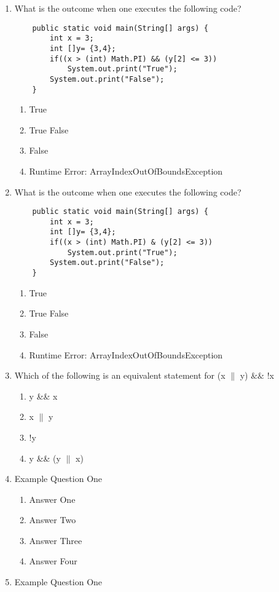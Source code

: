 \documentclass[11pt,fleqn]{article}
\begin{document}
\begin{enumerate}
\begin{enumerate}
	\end{enumerate}
\item What is the outcome when one executes the following code?
	\begin{verbatim}
	public static void main(String[] args) {
		int x = 3;
		int []y= {3,4};
		if((x > (int) Math.PI) && (y[2] <= 3)) 
			System.out.print("True");
		System.out.print("False");
	}
	\end{verbatim}
	\begin{enumerate}
	\item True
	\item True False
	\item False
	\item Runtime Error: ArrayIndexOutOfBoundsException
	\end{enumerate}
\item What is the outcome when one executes the following code?
	\begin{verbatim}
	public static void main(String[] args) {
		int x = 3;
		int []y= {3,4};
		if((x > (int) Math.PI) & (y[2] <= 3)) 
			System.out.print("True");
		System.out.print("False");
	}
	\end{verbatim}
	\begin{enumerate}
	\item True
	\item True False
	\item False
	\item Runtime Error: ArrayIndexOutOfBoundsException
	\end{enumerate}
\item Which of the following is an equivalent statement for (x $\|$ y) $\&\&$ !x
	\begin{enumerate}
	\item y \&\& x
	\item x $\|$ y
	\item !y
	\item y \&\& (y $\|$ x)
	\end{enumerate}
\newpage
\item Example Question One
	\begin{enumerate}
	\item Answer One
	\item Answer Two
	\item Answer Three
	\item Answer Four
	\end{enumerate}
\item Example Question One
	\begin{enumerate}

\end{enumerate}
\end{enumerate}
\end{document}

